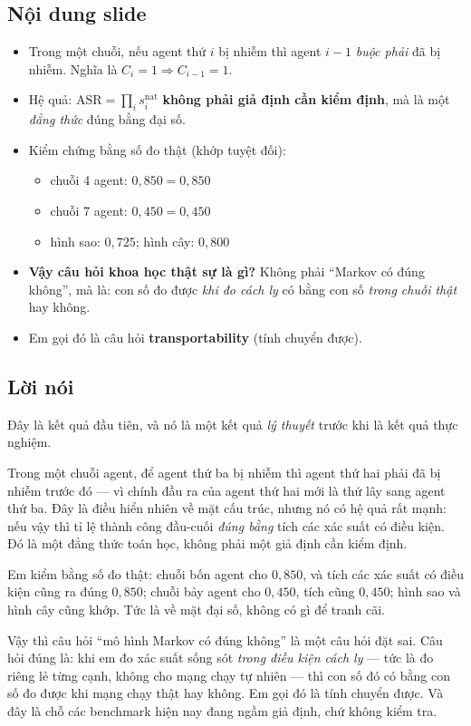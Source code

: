 \documentclass[11pt,a4paper]{article}
\newcommand{\noidung}{\subsection*{Nội dung slide}}
\newcommand{\loinoi}{\subsection*{Lời nói}}
\newcommand{\term}[2]{\textbf{#1} (#2)}
\begin{document}
\noidung
\begin{itemize}
  \item Trong một chuỗi, nếu agent thứ $i$ bị nhiễm thì agent $i-1$ \emph{buộc phải}
        đã bị nhiễm. Nghĩa là $C_i=1 \Rightarrow C_{i-1}=1$.
  \item Hệ quả: $\mathrm{ASR} = \prod_i s_i^{\mathrm{nat}}$
        \textbf{không phải giả định cần kiểm định}, mà là một \emph{đẳng thức} đúng
        bằng đại số.
  \item Kiểm chứng bằng số đo thật (khớp tuyệt đối):
        \begin{itemize}
          \item chuỗi 4 agent: $0{,}850 = 0{,}850$
          \item chuỗi 7 agent: $0{,}450 = 0{,}450$
          \item hình sao: $0{,}725$; hình cây: $0{,}800$
        \end{itemize}
  \item \textbf{Vậy câu hỏi khoa học thật sự là gì?} Không phải ``Markov có đúng
        không'', mà là: con số đo được \emph{khi đo cách ly} có bằng con số
        \emph{trong chuỗi thật} hay không.
  \item Em gọi đó là câu hỏi \term{transportability}{tính chuyển được}.
\end{itemize}

\loinoi
Đây là kết quả đầu tiên, và nó là một kết quả \emph{lý thuyết} trước khi là kết quả
thực nghiệm.

Trong một chuỗi agent, để agent thứ ba bị nhiễm thì agent thứ hai phải đã bị nhiễm
trước đó --- vì chính đầu ra của agent thứ hai mới là thứ lây sang agent thứ ba. Đây
là điều hiển nhiên về mặt cấu trúc, nhưng nó có hệ quả rất mạnh: nếu vậy thì tỉ lệ
thành công đầu-cuối \emph{đúng bằng} tích các xác suất có điều kiện. Đó là một đẳng
thức toán học, không phải một giả định cần kiểm định.

Em kiểm bằng số đo thật: chuỗi bốn agent cho $0{,}850$, và tích các xác suất có điều
kiện cũng ra đúng $0{,}850$; chuỗi bảy agent cho $0{,}450$, tích cũng $0{,}450$; hình
sao và hình cây cũng khớp. Tức là về mặt đại số, không có gì để tranh cãi.

Vậy thì câu hỏi ``mô hình Markov có đúng không'' là một câu hỏi đặt sai. Câu hỏi đúng
là: khi em đo xác suất sống sót \emph{trong điều kiện cách ly} --- tức là đo riêng lẻ
từng cạnh, không cho mạng chạy tự nhiên --- thì con số đó có bằng con số đo được khi
mạng chạy thật hay không. Em gọi đó là tính chuyển được. Và đây là chỗ các benchmark
hiện nay đang ngầm giả định, chứ không kiểm tra.
\end{document}
